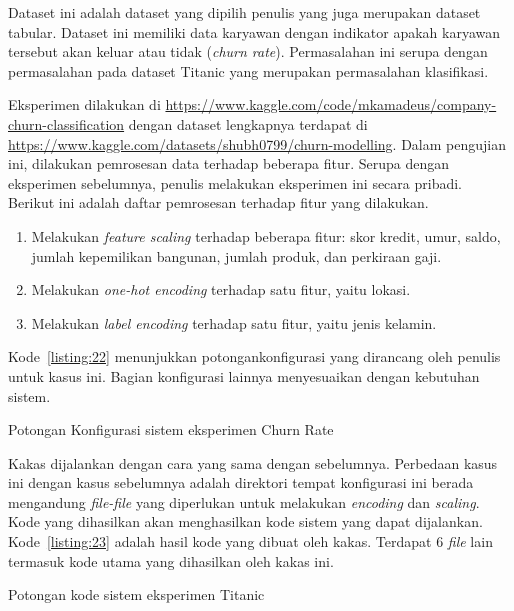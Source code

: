 Dataset ini adalah dataset yang dipilih penulis yang juga merupakan dataset tabular.
Dataset ini memiliki data karyawan dengan indikator apakah karyawan tersebut akan keluar atau tidak (\textit{churn rate}).
Permasalahan ini serupa dengan permasalahan pada dataset Titanic yang merupakan permasalahan klasifikasi.

Eksperimen dilakukan di \url{https://www.kaggle.com/code/mkamadeus/company-churn-classification} dengan dataset lengkapnya terdapat di \url{https://www.kaggle.com/datasets/shubh0799/churn-modelling}.
Dalam pengujian ini, dilakukan pemrosesan data terhadap beberapa fitur.
Serupa dengan eksperimen sebelumnya, penulis melakukan eksperimen ini secara pribadi.
Berikut ini adalah daftar pemrosesan terhadap fitur yang dilakukan.

\begin{enumerate}
	\item Melakukan \textit{feature scaling} terhadap beberapa fitur: skor kredit, umur, saldo, jumlah kepemilikan bangunan, jumlah produk, dan perkiraan gaji.
	\item Melakukan \textit{one-hot encoding} terhadap satu fitur, yaitu lokasi.
	\item Melakukan \textit{label encoding} terhadap satu fitur, yaitu jenis kelamin.
\end{enumerate}

Kode~\ref{listing:22} menunjukkan potongankonfigurasi yang dirancang oleh penulis untuk kasus ini.
Bagian konfigurasi lainnya menyesuaikan dengan kebutuhan sistem.

\begin{code}
	\caption{Potongan Konfigurasi sistem eksperimen Churn Rate}\label{listing:22}
\end{code}

Kakas dijalankan dengan cara yang sama dengan sebelumnya.
Perbedaan kasus ini dengan kasus sebelumnya adalah direktori tempat konfigurasi ini berada mengandung \textit{file-file} yang diperlukan untuk melakukan \textit{encoding} dan \textit{scaling}.
Kode yang dihasilkan akan menghasilkan kode sistem yang dapat dijalankan.
Kode~\ref{listing:23} adalah hasil kode yang dibuat oleh kakas.
Terdapat 6 \textit{file} lain termasuk kode utama yang dihasilkan oleh kakas ini.

\begin{code}
	\caption{Potongan kode sistem eksperimen Titanic}\label{listing:23}
\end{code}

